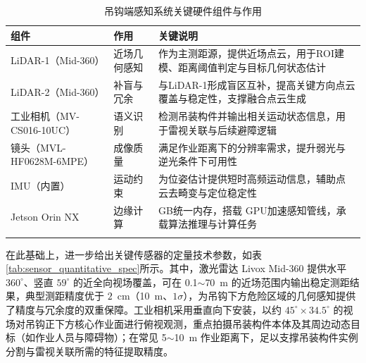 \begin{table}[htbp]
  \centering
  \caption{吊钩端感知系统关键硬件组件与作用}
  \begin{tabular*}{\textwidth}{@{\extracolsep{\fill}}>{\centering\arraybackslash}m{4.5cm}>{\centering\arraybackslash}m{2.5cm}>{\centering\arraybackslash}m{6.3cm}}
    \Xhline{1pt}
    \textbf{组件} & \textbf{作用} & \textbf{关键说明}\\
    \hline
    LiDAR-1（Mid-360） & 近场几何感知 & 作为主测距源，提供近场点云，用于ROI建模、距离阈值判定与目标几何状态估计\\
    LiDAR-2（Mid-360） & 补盲与冗余 & 与LiDAR-1形成盲区互补，提高关键方向点云覆盖与稳定性，支撑融合点云生成\\
    工业相机（MV-CS016-10UC） & 语义识别 & 检测吊装构件并输出相关运动状态信息，用于雷视关联与后续避障逻辑\\
    镜头（MVL-HF0628M-6MPE） & 成像质量 & 满足作业距离下的分辨率需求，提升弱光与逆光条件下可用性\\
    IMU（内置） & 运动约束 & 为位姿估计提供短时高频运动信息，辅助点云去畸变与定位稳定性\\
    Jetson Orin NX & 边缘计算 & 16 GB统一内存，搭载 GPU加速感知管线，承载算法推理与计算任务\\
    \Xhline{1pt}
  \end{tabular*}
  \label{tab:sensor_spec}
\end{table}

在此基础上，进一步给出关键传感器的定量技术参数，如表\ref{tab:sensor_quantitative_spec}所示。其中，激光雷达 Livox Mid-360 提供水平 $360^\circ$、竖直 $59^\circ$ 的近全向视场覆盖，可在 0.1$\sim$70~m 的近场范围内输出稳定测距结果，典型测距精度优于 $2$~cm（10~m、$1\sigma$），为吊钩下方危险区域的几何感知提供了精度与冗余度的双重保障。工业相机采用垂直向下安装，以约 $45^\circ\times 34.5^\circ$ 的视场对吊钩正下方核心作业面进行俯视观测，重点拍摄吊装构件本体及其周边动态目标（如作业人员与障碍物）；在常见 5$\sim$10~m 作业距离下，足以支撑吊装构件实例分割与雷视关联所需的特征提取精度。

